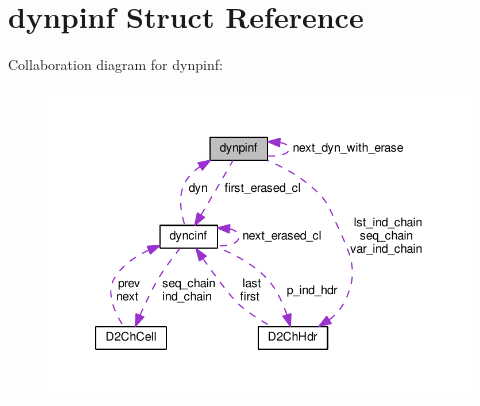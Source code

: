 \hypertarget{structdynpinf}{}\section{dynpinf Struct Reference}
\label{structdynpinf}


Collaboration diagram for dynpinf\+:\nopagebreak
\begin{figure}[H]
\begin{center}
\leavevmode
\includegraphics[width=350pt]{structdynpinf__coll__graph}
\end{center}
\end{figure}

